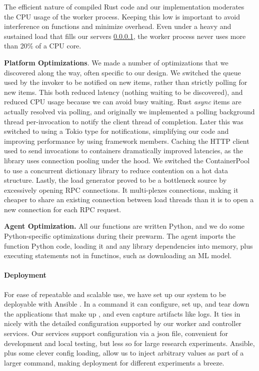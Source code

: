 The efficient nature of compiled Rust code and our implementation moderates the CPU usage of the worker process.
Keeping this low is important to avoid interference on functions and minimize overhead.
Even under a heavy and sustained load that fills our servers \ref{}, the \sysname{} worker process never uses more than 20\% of a CPU core.

\textbf{Platform Optimizations}.
We made a number of optimizations that we discovered along the way, often specific to our design.
We switched the queue used by the invoker to be notified on new items, rather than strictly polling for new items.
This both reduced latency (nothing waiting to be discovered), and reduced CPU usage because we can avoid busy waiting.
Rust \emph{async} items are actually resolved via polling, and originally we implemented a polling background thread per-invocation to notify the client thread of completion.
Later this was switched to using a Tokio type for notifications, simplifying our code and improving performance by using framework members.
Caching the HTTP client used to send invocations to containers dramatically improved latencies, as the library uses connection pooling under the hood.
We switched the ContainerPool to use a concurrent dictionary library to reduce contention on a hot data structure.
Lastly, the load generator proved to be a bottleneck source by excessively opening RPC connections.
It multi-plexes connections, making it cheaper to share an existing connection between load threads than it is to open a new connection for each RPC request.

\noindent \textbf{Agent Optimization.}
All our functions are written Python, and we do some Python-specific optimizations during their prewarm.
The agent imports the function Python code, loading it and any library dependencies into memory, plus executing statements not in functinos, such as downloading an ML model.



\paragraph{Deployment}
For ease of repeatable and scalable use, we have set up our system to be deployable with Ansible \cite{}.
In a command it can configure, set up, and tear down the applications that make up \sysname{}, and even capture artifacts like logs.
It ties in nicely with the detailed configuration supported by our worker and controller services.
Our services support configuration via a json file, convenient for development and local testing, but less so for large research experiments.
Ansible, plus some clever config loading, allow us to inject arbitrary values as part of a larger command, making deployment for different experiments a breeze.

